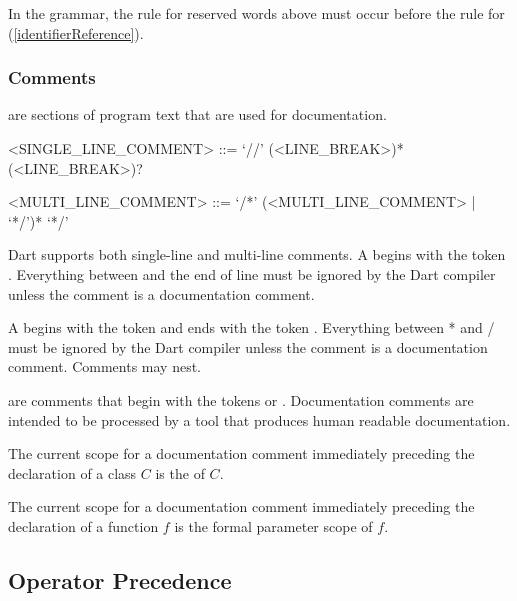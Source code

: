 \documentclass[makeidx]{article}
\begin{document}
{\LMHash{}%
In the grammar, the rule for reserved words above must occur
before the rule for 
(\ref{identifierReference}).



\subsubsection{Comments}

\LMHash{}%
are sections of program text that are used for documentation.

\begin{grammar}
<SINGLE\_LINE\_COMMENT> ::= \gnewline{}
  `//' \gtilde(<LINE\_BREAK>)* (<LINE\_BREAK>)?

<MULTI\_LINE\_COMMENT> ::= \gnewline{}
  `/*' (<MULTI\_LINE\_COMMENT> | \gtilde{} `*/')* `*/'
\end{grammar}

\LMHash{}%
Dart supports both single-line and multi-line comments.
A  begins with the token \code{//}.
Everything between \code{//} and the end of line
must be ignored by the Dart compiler
unless the comment is a documentation comment.

\LMHash{}%
A  begins with the token \code{/*}
and ends with the token \code{*/}.
Everything between \code{/}* and \code{*}/
must be ignored by the Dart compiler
unless the comment is a documentation comment.
Comments may nest.

\LMHash{}%
are comments that begin with the tokens \code{///} or \code{/**}.
Documentation comments are intended to be processed by
a tool that produces human readable documentation.

\LMHash{}%
The current scope for a documentation comment immediately preceding
the declaration of a class $C$ is the
of $C$.

\LMHash{}%
The current scope for a documentation comment immediately preceding
the declaration of a function $f$ is the formal parameter scope of $f$.


\subsection{Operator Precedence}

}
\end{document}
